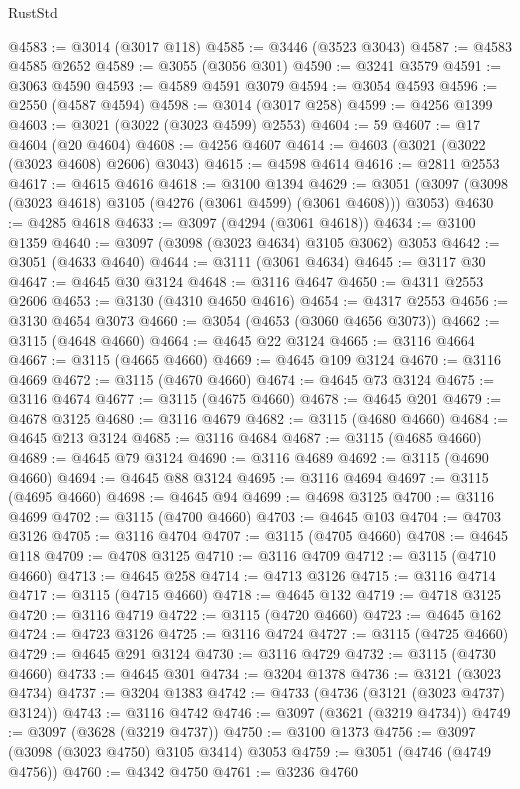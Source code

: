 \begin{lexlean}{RustStd}
\begin{coremodule}
{\begin{coremodule}
{{{{{{{{{{{{{{{{{{{{{{{{{{{{{{{{@4583 := @3014 (@3017 @118)
@4585 := @3446 (@3523 @3043)
@4587 := @4583 @4585 @2652
@4589 := @3055 (@3056 @301)
@4590 := @3241 @3579
@4591 := @3063 @4590
@4593 := @4589 @4591 @3079
@4594 := @3054 @4593
@4596 := @2550 (@4587 @4594)
@4598 := @3014 (@3017 @258)
@4599 := @4256 @1399
@4603 := @3021 (@3022 (@3023 @4599) @2553)
@4604 := 59
@4607 := @17 @4604 (@20 @4604)
@4608 := @4256 @4607
@4614 := @4603 (@3021 (@3022 (@3023 @4608) @2606) @3043)
@4615 := @4598 @4614
@4616 := @2811 @2553
@4617 := @4615 @4616
@4618 := @3100 @1394
@4629 := @3051 (@3097 (@3098 (@3023 @4618) @3105 (@4276 (@3061 @4599) (@3061 @4608))) @3053)
@4630 := @4285 @4618
@4633 := @3097 (@4294 (@3061 @4618))
@4634 := @3100 @1359
@4640 := @3097 (@3098 (@3023 @4634) @3105 @3062) @3053
@4642 := @3051 (@4633 @4640)
@4644 := @3111 (@3061 @4634)
@4645 := @3117 @30
@4647 := @4645 @30 @3124
@4648 := @3116 @4647
@4650 := @4311 @2553 @2606
@4653 := @3130 (@4310 @4650 @4616)
@4654 := @4317 @2553
@4656 := @3130 @4654 @3073
@4660 := @3054 (@4653 (@3060 @4656 @3073))
@4662 := @3115 (@4648 @4660)
@4664 := @4645 @22 @3124
@4665 := @3116 @4664
@4667 := @3115 (@4665 @4660)
@4669 := @4645 @109 @3124
@4670 := @3116 @4669
@4672 := @3115 (@4670 @4660)
@4674 := @4645 @73 @3124
@4675 := @3116 @4674
@4677 := @3115 (@4675 @4660)
@4678 := @4645 @201
@4679 := @4678 @3125
@4680 := @3116 @4679
@4682 := @3115 (@4680 @4660)
@4684 := @4645 @213 @3124
@4685 := @3116 @4684
@4687 := @3115 (@4685 @4660)
@4689 := @4645 @79 @3124
@4690 := @3116 @4689
@4692 := @3115 (@4690 @4660)
@4694 := @4645 @88 @3124
@4695 := @3116 @4694
@4697 := @3115 (@4695 @4660)
@4698 := @4645 @94
@4699 := @4698 @3125
@4700 := @3116 @4699
@4702 := @3115 (@4700 @4660)
@4703 := @4645 @103
@4704 := @4703 @3126
@4705 := @3116 @4704
@4707 := @3115 (@4705 @4660)
@4708 := @4645 @118
@4709 := @4708 @3125
@4710 := @3116 @4709
@4712 := @3115 (@4710 @4660)
@4713 := @4645 @258
@4714 := @4713 @3126
@4715 := @3116 @4714
@4717 := @3115 (@4715 @4660)
@4718 := @4645 @132
@4719 := @4718 @3125
@4720 := @3116 @4719
@4722 := @3115 (@4720 @4660)
@4723 := @4645 @162
@4724 := @4723 @3126
@4725 := @3116 @4724
@4727 := @3115 (@4725 @4660)
@4729 := @4645 @291 @3124
@4730 := @3116 @4729
@4732 := @3115 (@4730 @4660)
@4733 := @4645 @301
@4734 := @3204 @1378
@4736 := @3121 (@3023 @4734)
@4737 := @3204 @1383
@4742 := @4733 (@4736 (@3121 (@3023 @4737) @3124))
@4743 := @3116 @4742
@4746 := @3097 (@3621 (@3219 @4734))
@4749 := @3097 (@3628 (@3219 @4737))
@4750 := @3100 @1373
@4756 := @3097 (@3098 (@3023 @4750) @3105 @3414) @3053
@4759 := @3051 (@4746 (@4749 @4756))
@4760 := @4342 @4750
@4761 := @3236 @4760
}}}}}}}}}}}}}}}}}}}}}}}}}}}}}}}}
\end{coremodule}}
\end{coremodule}
\end{lexlean}
